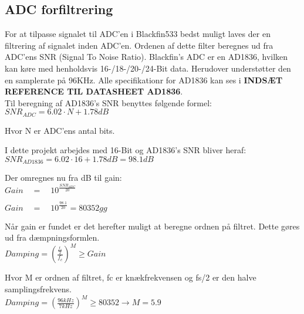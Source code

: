 
\subsection{ADC forfiltrering}

For at tilpasse signalet til ADC'en i Blackfin533 bedst muligt laves der en filtrering af signalet inden ADC'en. 
Ordenen af dette filter beregnes ud fra ADC'ens SNR (Signal To Noise Ratio). Blackfin's ADC er en AD1836, hvilken kan køre med henholdsvis 16-/18-/20-/24-Bit data. Herudover understøtter den en samplerate på 96KHz. Alle specifikationr for AD1836 kan ses i \textbf{INDSÆT REFERENCE TIL DATASHEET AD1836}. \\

Til beregning af AD1836's SNR benyttes følgende formel: \\
${ SNR }_{ ADC }=6.02\cdot N+1.78dB$

Hvor N er ADC'ens antal bits. 

I dette projekt arbejdes med 16-Bit og AD1836's SNR bliver heraf: \\
${ SNR }_{ AD1836 }=6.02\cdot 16+1.78dB = 98.1dB$

Der omregnes nu fra dB til gain: \\
$Gain\quad =\quad { 10 }^{ \frac { { SNR }_{ ADC } }{ 20 }  }$

$Gain\quad =\quad { 10 }^{ \frac { 98.1 }{ 20 }  }=80352gg$

Når gain er fundet er det herefter muligt at beregne ordnen på filtret. Dette gøres ud fra dæmpningsformlen. \\
$Damping={ \left( \frac { \frac { { f }_{ s } }{ 2 }  }{ { f }_{ c } }  \right)  }^{ M }\ge Gain$

Hvor M er ordnen af filtret, fc er knækfrekvensen og fs/2 er den halve samplingsfrekvens.\\
$Damping={ \left( \frac { 96kHz }{ 7kHz }  \right)  }^{ M }\ge 80352\rightarrow M=5.9$








